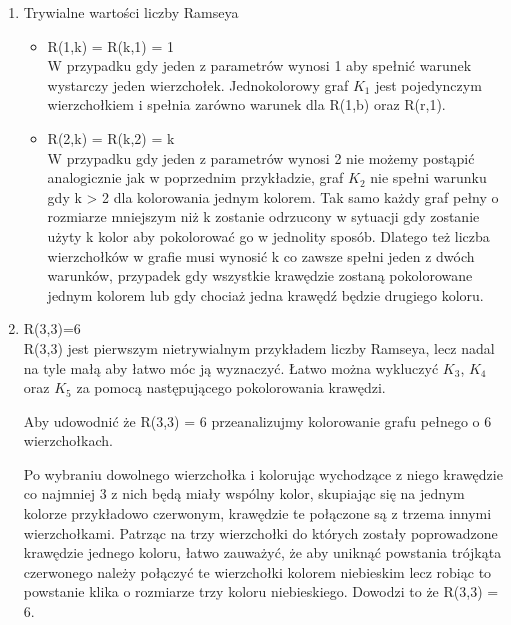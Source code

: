 \documentclass[11pt]{article}
\begin{document}
\begin{enumerate}
  \item Trywialne wartości liczby Ramseya \hfill 
  
  \begin{itemize}
  \item R(1,k) = R(k,1) = 1 \hfill \\
  W przypadku gdy jeden z parametrów wynosi 1 aby spełnić warunek wystarczy jeden wierzchołek.  Jednokolorowy graf $\mathit{K}_{1}$ jest pojedynczym wierzchołkiem i spełnia zarówno warunek dla R(1,b) oraz R(r,1).
  
   \item R(2,k) = R(k,2) = k \hfill \\
	W przypadku gdy jeden z parametrów wynosi 2 nie możemy postąpić analogicznie jak w poprzednim przykładzie, graf $\mathit{K}_{2}$ nie spełni warunku gdy k > 2 dla kolorowania jednym kolorem. Tak samo każdy graf pełny o rozmiarze mniejszym niż k zostanie odrzucony w sytuacji gdy zostanie użyty k kolor aby pokolorować go w jednolity sposób. Dlatego też liczba wierzchołków w grafie musi wynosić k co zawsze spełni jeden z dwóch warunków, przypadek gdy wszystkie krawędzie zostaną pokolorowane jednym kolorem lub gdy chociaż jedna krawędź będzie drugiego koloru.
  	
  \end{itemize}

  
 
  \item R(3,3)=6 \hfill \\ 
  R(3,3) jest pierwszym nietrywialnym przykładem liczby Ramseya, lecz nadal na tyle małą aby łatwo móc ją wyznaczyć. Łatwo można wykluczyć $\mathit{K}_{3}$, $\mathit{K}_{4}$ oraz $\mathit{K}_{5}$ za pomocą następującego pokolorowania krawędzi.
  
 

  
Aby udowodnić że R(3,3) = 6 przeanalizujmy kolorowanie grafu pełnego o 6 wierzchołkach. 
  
Po wybraniu dowolnego wierzchołka i kolorując wychodzące z niego krawędzie co najmniej 3 z nich będą miały wspólny kolor, skupiając się na jednym kolorze przykładowo czerwonym, krawędzie te połączone są z trzema innymi wierzchołkami. Patrząc na trzy wierzchołki do których zostały poprowadzone krawędzie jednego koloru, łatwo zauważyć, że aby uniknąć powstania trójkąta czerwonego należy połączyć te wierzchołki kolorem niebieskim lecz robiąc to powstanie klika o rozmiarze trzy koloru niebieskiego. Dowodzi to że R(3,3) = 6.
    




\end{enumerate}
\end{document}
